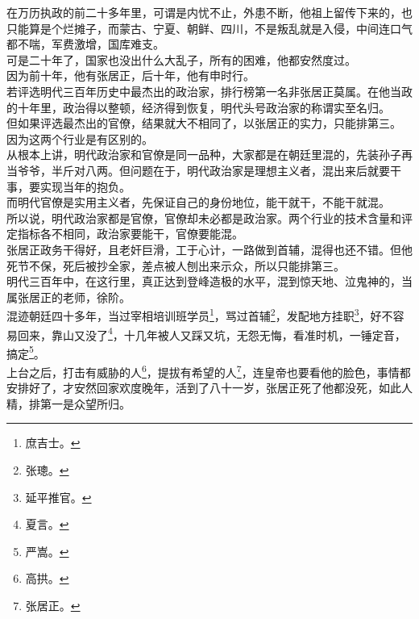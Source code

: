 	\begin{multicols}{\theparacolNo}
\fi
在万历执政的前二十多年里，可谓是内忧不止，外患不断，他祖上留传下来的，也只能算是个烂摊子，而蒙古、宁夏、朝鲜、四川，不是叛乱就是入侵，中间连口气都不喘，军费激增，国库难支。\\

可是二十年了，国家也没出什么大乱子，所有的困难，他都安然度过。\\

因为前十年，他有张居正，后十年，他有申时行。\\

若评选明代三百年历史中最杰出的政治家，排行榜第一名非张居正莫属。在他当政的十年里，政治得以整顿，经济得到恢复，明代头号政治家的称谓实至名归。\\

但如果评选最杰出的官僚，结果就大不相同了，以张居正的实力，只能排第三。\\

因为这两个行业是有区别的。\\

从根本上讲，明代政治家和官僚是同一品种，大家都是在朝廷里混的，先装孙子再当爷爷，半斤对八两。但问题在于，明代政治家是理想主义者，混出来后就要干事，要实现当年的抱负。\\

而明代官僚是实用主义者，先保证自己的身份地位，能干就干，不能干就混。\\

所以说，明代政治家都是官僚，官僚却未必都是政治家。两个行业的技术含量和评定指标各不相同，政治家要能干，官僚要能混。\\

张居正政务干得好，且老奸巨滑，工于心计，一路做到首辅，混得也还不错。但他死节不保，死后被抄全家，差点被人刨出来示众，所以只能排第三。\\

明代三百年中，在这行里，真正达到登峰造极的水平，混到惊天地、泣鬼神的，当属张居正的老师，徐阶。\\

混迹朝廷四十多年，当过宰相培训班学员\footnote{庶吉士。}，骂过首辅\footnote{张璁。}，发配地方挂职\footnote{延平推官。}，好不容易回来，靠山又没了\footnote{夏言。}，十几年被人又踩又坑，无怨无悔，看准时机，一锤定音，搞定\footnote{严嵩。}。\\

上台之后，打击有威胁的人\footnote{高拱。}，提拔有希望的人\footnote{张居正。}，连皇帝也要看他的脸色，事情都安排好了，才安然回家欢度晚年，活到了八十一岁，张居正死了他都没死，如此人精，排第一是众望所归。\\


\end{multicols}

